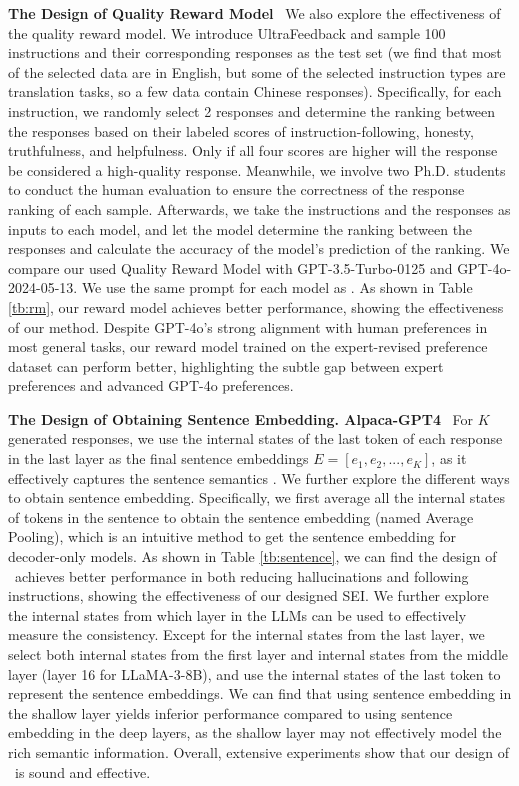 \noindent
\textbf{The Design of Quality Reward Model}
\
We also explore the effectiveness of the quality reward model.
We introduce UltraFeedback \citep{cui2024ultrafeedback} and sample 100 instructions and their corresponding responses as the test set (we find that most of the selected data are in English, but some of the selected instruction types are translation tasks, so a few data contain Chinese responses).
Specifically, for each instruction, we randomly select 2 responses and determine the ranking between the responses based on their labeled scores of instruction-following, honesty, truthfulness, and helpfulness.
Only if all four scores are higher will the response be considered a high-quality response.
Meanwhile, we involve two Ph.D. students to conduct the human evaluation to ensure the correctness of the response ranking of each sample.
Afterwards, we take the instructions and the responses as inputs to each model, and let the model determine the ranking between the responses and calculate the accuracy of the model's prediction of the ranking.
We compare our used Quality Reward Model with GPT-3.5-Turbo-0125 and GPT-4o-2024-05-13.
We use the same prompt for each model as \citet{ge2024clustering}.
As shown in Table \ref{tb:rm}, our reward model achieves better performance, showing the effectiveness of our method.
Despite GPT-4o’s strong alignment with human preferences in most general tasks, our reward model trained on the expert-revised preference dataset can perform better, highlighting the subtle gap between expert preferences and advanced GPT-4o preferences.



\noindent
\textbf{The Design of Obtaining Sentence Embedding. Alpaca-GPT4}
\
For $K$ generated responses, we use the internal states of the last token of each response in the last layer as the final sentence embeddings $E=[e_1,e_2,...,e_K]$, as it effectively captures the sentence semantics \citep{azaria2023the}.
We further explore the different ways to obtain sentence embedding.
Specifically, we first average all the internal states of tokens in the sentence to obtain the sentence embedding (named Average Pooling), which is an intuitive method to get the sentence embedding for decoder-only models.
As shown in Table \ref{tb:sentence}, we can find the design of \OURS~achieves better performance in both reducing hallucinations and following instructions, showing the effectiveness of our designed SEI.
We further explore the internal states from which layer in the LLMs can be used to effectively measure the consistency.
Except for the internal states from the last layer, we select both internal states from the first layer and internal states from the middle layer (layer 16 for LLaMA-3-8B), and use the internal states of the last token to represent the sentence embeddings.
We can find that using sentence embedding in the shallow layer yields inferior performance compared to using sentence embedding in the deep layers, as the shallow layer may not effectively model the rich semantic information.
Overall, extensive experiments show that our design of \OURS~is sound and effective.

